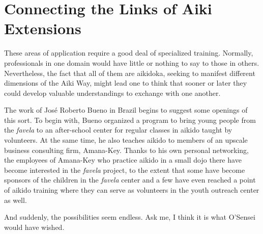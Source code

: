 \section*{Connecting the Links of Aiki Extensions}

These areas of application require a good deal of specialized training. Normally, professionals in one domain would have little or nothing to say to those in others. Nevertheless, the fact that all of them are aikidoka, seeking to manifest different dimensions of the Aiki Way, might lead one to think that sooner or later they could develop valuable understandings to exchange with one another. 

The work of Jos\'{e} Roberto Bueno in Brazil begins to suggest some openings of this sort. To begin with, Bueno organized a program to bring young people from the \emph{favela} to an after-school center for regular classes in aikido taught by volunteers. At the same time, he also teaches aikido to members of an upscale business consulting firm, Amana-Key. Thanks to his own personal networking, the employees of Amana-Key who practice aikido in a small dojo there have become interested in the \emph{favela} project, to the extent that some have become sponsors of the children in the \emph{favela} center and a few have even reached a point of aikido training where they can serve as volunteers in the youth outreach center as well. 

And suddenly, the possibilities seem endless. Ask me, I think it is what O'Sensei would have wished. 